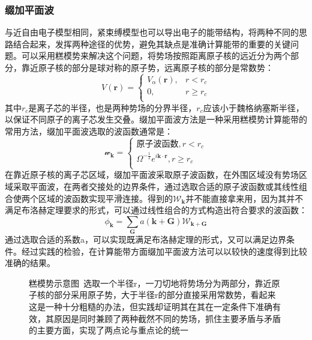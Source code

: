 \subsubsection{缀加平面波}
与近自由电子模型相同，紧束缚模型也可以导出电子的能带结构，将两种不同的思路结合起来，发挥两种途径的优势，避免其缺点是准确计算能带的重要的关键问题。可以采用糕模势来解决这个问题，将势场按照距离原子核的远近分为两个部分，靠近原子核的部分是球对称的原子势，远离原子核的部分是常数势：
\begin{equation}
    V(\bm{r})=
    \begin{cases}
        V_{\alpha}(\bm{r}), & r<r_{c} \\
        0, & r \geq r_{c} \\
    \end{cases}
\end{equation}
其中$r_{c}$是离子芯的半径，也是两种势场的分界半径，$r_{c}$应该小于魏格纳塞斯半径，以保证不同原子的离子芯发生交叠。缀加平面波方法是一种采用糕模势计算能带的常用方法，缀加平面波选取的波函数通常是：
\begin{equation}
    \mathcal{w}_{\bm{k}}=
    \begin{cases}
        \text{原子波函数},  r<r_{c} \\
        \Omega^{-\frac{1}{2}}e^{i\bm{k}\cdot\bm{r}},  r \geq r_{c} \\
    \end{cases}
\end{equation}
在靠近原子核的离子芯区域，缀加平面波采取原子波函数，在外围区域没有势场区域采取平面波，在两者交接处的边界条件，通过选取合适的原子波函数或其线性组合使两个区域的波函数实现平滑连接。得到的$\mathcal{W}_{\bm{k}}$并不能直接拿来用，因为其并不满足布洛赫定理要求的形式，可以通过线性组合的方式构造出符合要求的波函数：
\begin{equation}
    \phi_{\bm{k}}=\sum_{\bm{G}}a(\bm{k}+\bm{G}) \mathcal{W} _{\bm{k}+\bm{G}}
\end{equation}
通过选取合适的系数a，可以实现既满足布洛赫定理的形式，又可以满足边界条件。经过实践的检验，在计算能带方面缀加平面波方法可以以较快的速度得到比较准确的结果。


\begin{figure}[h]
    \centering
    \resizebox{\textwidth}{!}{
    
    }
    \vspace*{-1cm}
    \caption{糕模势示意图\ 选取一个半径r，一刀切地将势场分为两部分，靠近原子核的部分采用原子势，大于半径r的部分直接采用常数势，看起来这是一种十分粗糙的办法，但实践却证明其在其在一定条件下准确有效，其原因是同时兼顾了两种截然不同的势场，抓住主要矛盾与矛盾的主要方面，实现了两点论与重点论的统一}
    \label{}
\end{figure}


